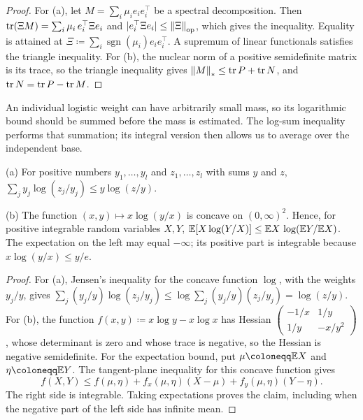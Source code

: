 \begin{proof}
For (a), let \(M=\sum_i\mu_ie_ie_i^\top\) be a spectral decomposition. Then
\(\operatorname{tr}(\Xi M)=\sum_i\mu_i\,e_i^\top\Xi e_i\) and \(|e_i^\top\Xi e_i|\le
\left\lVert\Xi\right\rVert_{\mathrm{op}}\), which gives the inequality. Equality is attained at
\(\Xi\coloneqq \sum_i\operatorname{sgn}(\mu_i)e_ie_i^\top\). A supremum of linear
functionals satisfies the triangle inequality. For (b), the nuclear norm of a
positive semidefinite matrix is its trace, so the triangle inequality gives
\(\left\lVert M\right\rVert_*\le\operatorname{tr} P+\operatorname{tr} N\), and \(\operatorname{tr} N=\operatorname{tr} P-\operatorname{tr} M\).
\end{proof}


An individual logistic weight can have arbitrarily small mass, so its
logarithmic bound should be summed before the mass is estimated. The
log-sum inequality performs that summation; its integral version then
allows us to average over the independent base.

\begin{fact}\label{tb:logsum}
(a) For positive numbers \(y_1,\ldots,y_l\) and \(z_1,\ldots,z_l\) with sums
\(y\) and \(z\),
\(\sum_jy_j\log(z_j/y_j)\le y\log(z/y)\).

(b) The function \((x,y)\mapsto x\log(y/x)\) is concave on \((0,\infty)^2\).
Hence, for positive integrable random variables \(X,Y\),
\(\mathbb E[X\log(Y/X)]\le\mathbb E X\,\log(\mathbb E Y/\mathbb E X)\).
The expectation on the left may equal \(-\infty\); its positive
part is integrable because \(x\log(y/x)\le y/e\).
\end{fact}

\begin{proof}
For (a), Jensen's inequality for the concave function \(\log\), with the
weights \(y_j/y\), gives \(\sum_j(y_j/y)\log(z_j/y_j)\le\log\sum_j(y_j/y)(z_j/y_j)
=\log(z/y)\). For (b), the function \(f(x,y)\coloneqq x\log y-x\log x\) has Hessian
\(\begin{pmatrix}-1/x&1/y\\1/y&-x/y^2\end{pmatrix}\), whose determinant is
zero and whose trace is negative, so the Hessian is negative semidefinite.
For the expectation bound, put \(\mu\coloneqq\E X\) and
\(\eta\coloneqq\E Y\). The tangent-plane inequality for this concave
function gives
\[
 f(X,Y)\le f(\mu,\eta)
   +f_x(\mu,\eta)(X-\mu)+f_y(\mu,\eta)(Y-\eta).
\]
The right side is integrable. Taking expectations proves the claim,
including when the negative part of the left side has infinite mean.
\end{proof}

